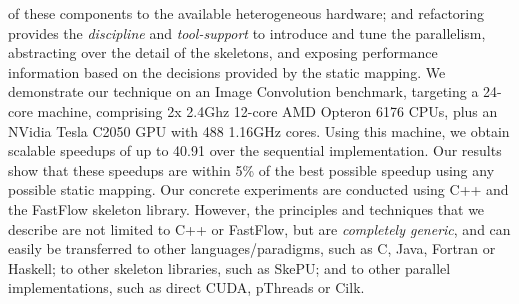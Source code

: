 \documentclass[smallextended]{svjour3}
\begin{document}
of these components to the available heterogeneous hardware; 
and refactoring provides the \emph{discipline} and \emph{tool-support} to introduce and tune the
parallelism, abstracting over the detail of the skeletons, and exposing performance information
based on the decisions provided by the static mapping.
%
We demonstrate our technique on an Image Convolution
benchmark, targeting a 24-core machine, comprising 2x 2.4Ghz 12-core AMD Opteron 6176 CPUs,
plus an NVidia Tesla C2050 GPU with 488 1.16GHz cores.
Using this machine, we obtain
scalable speedups of up to 40.91 over the sequential implementation.
Our results show that these speedups are within 5\% of the best possible speedup using any possible static mapping.
Our concrete experiments are conducted using C++ and the FastFlow skeleton library. 
However, the principles and techniques that we
describe are not limited to C++ or FastFlow, but are \emph{completely generic}, and can easily be
transferred to other languages/paradigms, such as C, Java, Fortran or Haskell;
to other skeleton libraries, such as SkePU; 
and to other parallel implementations, such as direct CUDA, pThreads or Cilk.
\end{document}
